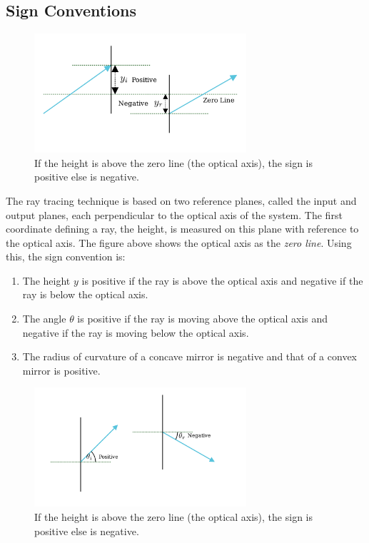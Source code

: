\documentclass[12pt]{article}
\begin{document}
\subsection{Sign Conventions}
\begin{figure}[h]
    \centering
    \includegraphics[width=0.7\textwidth]{images/sc_y_2.png}
    \caption{If the height is above the zero line (the optical axis), the sign is positive else is negative.}
    \label{fig:sign-y}
\end{figure}
The ray tracing technique is based on two reference planes, called the input and output planes, each perpendicular to the optical axis of the system. The first coordinate defining a ray, the height, is measured on this plane with reference to the optical axis. The figure above shows the optical axis as the \textit{zero line}. Using this, the sign convention is:
\begin{enumerate}
    \item The height \(y\) is positive if the ray is above the optical axis and negative if the ray is below the optical axis.
    \item The angle \(\theta\) is positive if the ray is moving above the optical axis and negative if the ray is moving below the optical axis.
    \item The radius of curvature of a concave mirror is negative and that of a convex mirror is positive.
\end{enumerate}
\begin{figure}[h]
    \centering
    \includegraphics[width=0.7\textwidth]{images/sc_2.png}
    \caption{If the height is above the zero line (the optical axis), the sign is positive else is negative.}
    \label{fig:sign-theta}
\end{figure}
\end{document}
